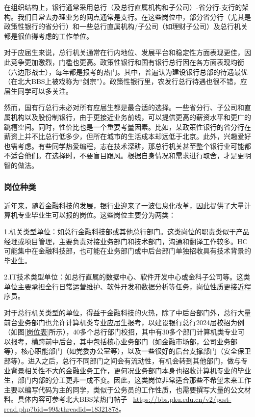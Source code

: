 在组织结构上，银行通常采用总行（及总行直属机构和子公司）-省分行-支行的架构。我们日常去办理业务的网点通常是支行。在这些岗位中，部分省分行（尤其是政策性银行的省分行）和一些总行直属机构/子公司（如理财子公司）及总行机关都是很值得考虑的工作单位。

对于应届生来说，总行机关通常在行内地位、发展平台和稳定性方面表现更佳，因此竞争更加激烈，门槛也更高。政策性银行和国有银行总行因在各方面表现均衡（六边形战士），每年都是报考的热门。其中，普遍认为建设银行总部的待遇最优（在北大BBS上被戏称为“剑宗”）。政策性银行里，农发行总行待遇也很不错，应届生同学可以多关注。

然而，国有行总行未必对所有应届生都是最合适的选择。一些省分行、子公司和直属机构以及股份制银行，由于更接近业务前线，可以提供更高的薪资水平和更广的跳槽空间。同时，性价比也是一个重要考量因素。比如，某政策性银行的省分行在薪资上并不比总行低多少，但所在城市的生活成本却远低于北京。此外，兴趣爱好也需考虑。有些同学热爱编程，志在技术深耕，那总行机关甚至整个银行业可能都不适合他们。在选择时，不要盲目跟风。根据自身情况和需求进行取舍，才是更明智的做法。

\subsubsection{岗位种类}

近年来，随着金融科技的发展，银行业迎来了一波信息化改革，因此提供了大量计算机专业毕业生可以报的岗位。这些岗位主要分为两类：

1.机关类型单位：如总行金融科技部或其他总行部门。这类岗位的职责类似于产品经理或项目管理，主要负责对接业务部门和技术部门，沟通和翻译工作较多。HC可能集中在金融科技部，也可能在业务部门或中后台部门单独招收具有技术背景的毕业生。

2.IT技术类型单位：如总行直属的数据中心、软件开发中心或金科子公司等。这类单位主要承担全行日常运营维护、软件开发和数据分析等任务，岗位性质更接近程序员。

对于总行机关类型的单位，得益于金融科技的火热，除了中后台部门外，总行大量前台业务部门也允许计算机类专业应届生报考，以建设银行总行2024届校招为例（如图\ref{岗位表}所示），40多个总行部门校招，其中有30多个部门计算机类专业可以报考，横跨前中后台，其中包括核心业务部门（如金融市场部，公司业务部等），核心职能部门（如党委办公室等），以及一些很好的后台支撑部门（安全保卫部等）。进入之后，总行不同部门之间会有流动性，有机会转到其他部门，做与专业背景相关性不大的金融业务工作，更何况业务部门本身也招收计算机专业的毕业生，部门内部的分工更非一成不变。因此，这类岗位非常适合那些不希望未来工作主要以编写代码为主的同学，类似于公务员的工作性质，也需要撰写大量的公文材料。具体内容可参考北大BBS某热门帖子
~\url{https://bbs.pku.edu.cn/v2/post-read.php?bid=99\&threadid=18321878}。

